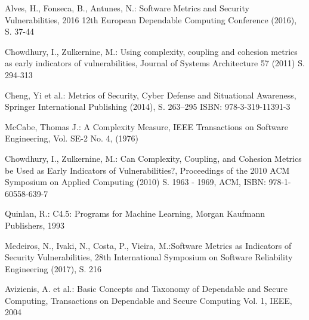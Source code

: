 
\begin{thebibliography}{8}
Alves, H., Fonseca, B., Antunes, N.: Software Metrics and Security Vulnerabilities, 2016 12th European Dependable Computing Conference (2016), S. 37-44

Chowdhury, I., Zulkernine, M.: Using complexity, coupling and cohesion metrics as early indicators of vulnerabilities, Journal of Systems Architecture 57 (2011) S. 294-313

Cheng, Yi et al.: Metrics of Security, Cyber Defense and Situational Awareness, Springer International Publishing (2014), S. 263--295
ISBN: 978-3-319-11391-3

McCabe, Thomas J.: A Complexity Measure, IEEE Transactions on Software Engineering, Vol. SE-2 No. 4, (1976)

Chowdhury, I., Zulkernine, M.: Can Complexity, Coupling, and Cohesion Metrics be Used as Early Indicators of Vulnerabilities?, Proceedings of the 2010 ACM Symposium on Applied Computing (2010) S. 1963 - 1969, ACM, ISBN: 978-1-60558-639-7

Quinlan, R.: C4.5: Programs for Machine Learning, Morgan Kaufmann Publishers, 1993

Medeiros, N., Ivaki, N., Costa, P., Vieira, M.:Software Metrics as Indicators of Security Vulnerabilities, 28th International Symposium on Software Reliability Engineering (2017), S. 216

Avizienis, A. et al.: Basic Concepts and Taxonomy of Dependable and Secure Computing, Transactions on Dependable and Secure Computing Vol. 1, IEEE, 2004

\end{thebibliography}
